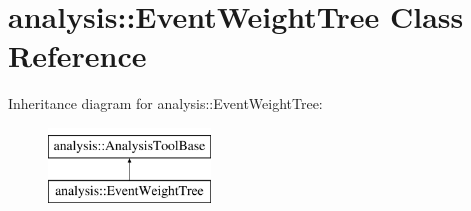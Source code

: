 \hypertarget{classanalysis_1_1EventWeightTree}{\section{analysis\-:\-:Event\-Weight\-Tree Class Reference}
\label{classanalysis_1_1EventWeightTree}
}
Inheritance diagram for analysis\-:\-:Event\-Weight\-Tree\-:\begin{figure}[H]
\begin{center}
\leavevmode
\includegraphics[height=2.000000cm]{classanalysis_1_1EventWeightTree}
\end{center}
\end{figure}
